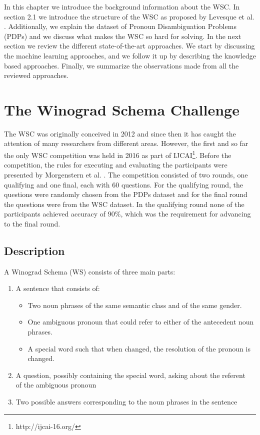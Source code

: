 \label{Background}
In this chapter we introduce the background information about the WSC. In section 2.1 we introduce the structure of the WSC as proposed by Levesque et al. \cite{DBLP:conf/kr/LevesqueDM12}. 
Additionally, we explain the dataset of Pronoun Disambiguation Problems (PDPs) and we discuss what makes the WSC so hard for solving. In the next section we review the different state-of-the-art approaches. We start by discussing the machine learning approaches, and we follow it up by describing the knowledge based approaches. Finally, we summarize the observations made from all the reviewed approaches.

 
\section{The Winograd Schema Challenge}
\label{section:TheWinogradSchemaChallenge}

The WSC was originally conceived in 2012 \cite{DBLP:conf/kr/LevesqueDM12} and since then it has caught the  attention of many researchers from different areas. However, the first and so far the only WSC competition was held in 2016 as part of IJCAI\footnote{http://ijcai-16.org/}. Before the competition, the rules for executing and evaluating the participants were presented by Morgenstern et al. \cite{DBLP:journals/aim/MorgensternDO16}. The competition consisted of two rounds, one qualifying and one final, each with 60 questions. For the qualifying round, the questions were randomly chosen from the PDPs dataset and for the final round the questions were from the WSC dataset. In the qualifying round none of the participants achieved accuracy of 90\%, which was the requirement for advancing to the final round. 


\subsection{Description}
A Winograd Schema (WS) consists of three main parts:

\begin{enumerate}
	\item A sentence that consists of:
	\begin{itemize}
		\item Two noun phrases of the same semantic class and of the same gender.
		\item One ambiguous pronoun that could refer to either of the antecedent noun phrases.
		\item A special word such that when changed, the resolution of the pronoun is changed.
	\end{itemize}
    \item A question, possibly containing the special word, asking about the referent \\of the ambiguous pronoun
    \item Two possible answers corresponding to the noun phrases in the sentence
\end{enumerate}

